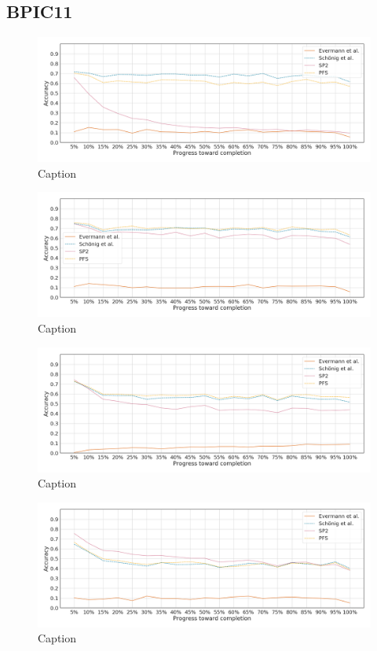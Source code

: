 \subsection{BPIC11}
\begin{figure}[!htb]
    \centering
    \includegraphics[width=\textwidth]{gfx/bpic2011/individual_stability.png}
    \caption{Caption}
    \label{fig:my_label}
\end{figure}
\begin{figure}[!htb]
    \centering
    \includegraphics[width=\textwidth]{gfx/bpic2011/grouped_stability.png}
    \caption{Caption}
    \label{fig:my_label}
\end{figure}
\begin{figure}[!htb]
    \centering
    \includegraphics[width=\textwidth]{gfx/bpic2011/padded_stability.png}
    \caption{Caption}
    \label{fig:my_label}
\end{figure}
\begin{figure}[!htb]
    \centering
    \includegraphics[width=\textwidth]{gfx/bpic2011/windowed_stability.png}
    \caption{Caption}
    \label{fig:my_label}
\end{figure}
\FloatBarrier

